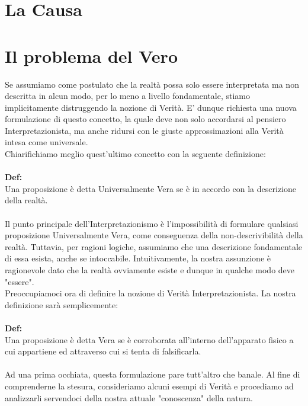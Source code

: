 \documentclass[]{scrbook}
\begin{document}
	\section{La Causa}
	
	\section{Il problema del Vero}
	Se assumiamo come postulato che la realtà possa solo essere interpretata ma non descritta in alcun modo, per lo meno a livello fondamentale, stiamo implicitamente distruggendo la nozione di Verità. E' dunque richiesta  una nuova formulazione di questo concetto, la quale deve non solo accordarsi al pensiero Interpretazionista, ma anche ridursi con le giuste approssimazioni alla Verità intesa come universale.\\
	Chiarifichiamo meglio quest'ultimo concetto con la seguente definizione:\\
	\\
	\textbf{Def:}\\
	Una proposizione è detta Universalmente Vera se è in accordo con la descrizione della realtà.\\
	\\
	Il punto principale dell'Interpretazionismo è l'impossibilità di formulare qualsiasi proposizione Universalmente Vera, come conseguenza della non-descrivibilità della realtà. Tuttavia, per ragioni logiche, assumiamo che una descrizione fondamentale di essa esista, anche se intoccabile. Intuitivamente, la nostra assunzione è ragionevole dato che la realtà ovviamente esiste e dunque in qualche modo deve "essere". \\
	Preoccupiamoci ora di definire la nozione di Verità Interpretazionista. La nostra definizione sarà semplicemente:\\
	\\
	\textbf{Def:}\\
	Una proposizione è detta Vera se è corroborata all'interno dell'apparato fisico a cui appartiene ed attraverso cui si tenta di falsificarla.\\
	\\
	Ad una prima occhiata, questa formulazione pare tutt'altro che banale. Al fine di comprenderne la stesura, consideriamo alcuni esempi di Verità e procediamo ad analizzarli servendoci della nostra attuale "conoscenza" della natura.\\
\end{document}
